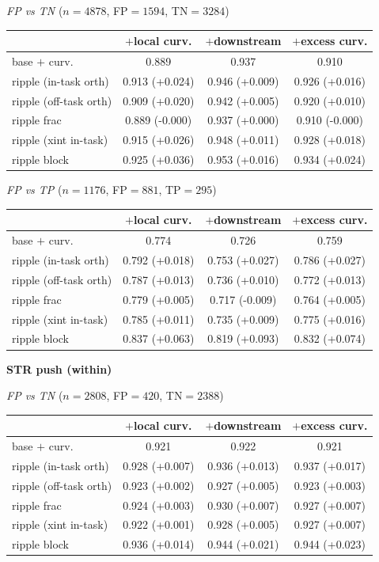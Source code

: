 \begin{table}[t]
\smallskip
\textit{FP vs TN} ($n=4878$, FP$=1594$, TN$=3284$)

\begin{tabular}{l c c c}
\toprule
 & $+$local curv. & $+$downstream & $+$excess curv. \\
\midrule
base $+$ curv. & 0.889 & 0.937 & 0.910 \\
\midrule
ripple (in-task orth) & 0.913 (+0.024) & 0.946 (+0.009) & 0.926 (+0.016) \\
ripple (off-task orth) & 0.909 (+0.020) & 0.942 (+0.005) & 0.920 (+0.010) \\
ripple frac & 0.889 (-0.000) & 0.937 (+0.000) & 0.910 (-0.000) \\
ripple (xint in-task) & 0.915 (+0.026) & 0.948 (+0.011) & 0.928 (+0.018) \\
ripple block & 0.925 (+0.036) & 0.953 (+0.016) & 0.934 (+0.024) \\
\bottomrule
\end{tabular}

\smallskip
\textit{FP vs TP} ($n=1176$, FP$=881$, TP$=295$)

\begin{tabular}{l c c c}
\toprule
 & $+$local curv. & $+$downstream & $+$excess curv. \\
\midrule
base $+$ curv. & 0.774 & 0.726 & 0.759 \\
\midrule
ripple (in-task orth) & 0.792 (+0.018) & 0.753 (+0.027) & 0.786 (+0.027) \\
ripple (off-task orth) & 0.787 (+0.013) & 0.736 (+0.010) & 0.772 (+0.013) \\
ripple frac & 0.779 (+0.005) & 0.717 (-0.009) & 0.764 (+0.005) \\
ripple (xint in-task) & 0.785 (+0.011) & 0.735 (+0.009) & 0.775 (+0.016) \\
ripple block & 0.837 (+0.063) & 0.819 (+0.093) & 0.832 (+0.074) \\
\bottomrule
\end{tabular}

\medskip
\textbf{STR push (within)}


\smallskip
\textit{FP vs TN} ($n=2808$, FP$=420$, TN$=2388$)

\begin{tabular}{l c c c}
\toprule
 & $+$local curv. & $+$downstream & $+$excess curv. \\
\midrule
base $+$ curv. & 0.921 & 0.922 & 0.921 \\
\midrule
ripple (in-task orth) & 0.928 (+0.007) & 0.936 (+0.013) & 0.937 (+0.017) \\
ripple (off-task orth) & 0.923 (+0.002) & 0.927 (+0.005) & 0.923 (+0.003) \\
ripple frac & 0.924 (+0.003) & 0.930 (+0.007) & 0.927 (+0.007) \\
ripple (xint in-task) & 0.922 (+0.001) & 0.928 (+0.005) & 0.927 (+0.007) \\
ripple block & 0.936 (+0.014) & 0.944 (+0.021) & 0.944 (+0.023) \\
\bottomrule
\end{tabular}


\end{table}
